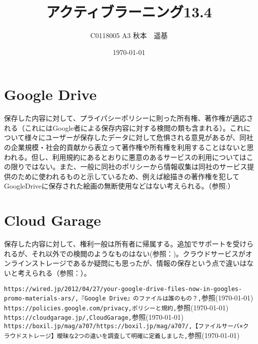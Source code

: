 \documentclass[uplatex]{jsarticle} %
\title{アクティブラーニング13.4}
\author{C0118005 A3 秋本　遥基}
\date{\today}
\begin{document}
\maketitle

\section{Google Drive}

  保存した内容に対して、プライパシーポリシーに則った所有権、著作権が適応される（これにはGoogle者による保存内容に対する検閲の類も含まれる）。これについて様々にユーザーが保存したデータに対して危惧される意見があるが、同社の企業規模・社会的貢献から表立って著作権や所有権を利用することはないと思われる。但し、利用規約にあるとおりに悪意のあるサービスの利用についてはこの限りではない。また、一般に同社のポリシーから情報収集は同社のサービス提供のために使われるものと示しているため、例えば絵描きの著作権を犯してGoogleDriveに保存された絵画の無断使用などはない考えられる。（参照:\cite{source}\cite{pli}）

\section{Cloud Garage}

  保存した内容に対して、権利一般は所有者に帰属する。追加でサポートを受けられるが、それ以外での検閲のようなものはない(参照：\cite{cloud})。クラウドサービスがオンラインストレージであるか疑問にも思ったが、情報の保存という点で違いはないと考えられる（参照：\cite{tigai}）。

\begin{thebibliography}{9}
   \verb+https://wired.jp/2012/04/27/your-google-drive-files-now-in-googles-promo-materials-ars/,『Google Drive』のファイルは誰のもの？,+参照(\today)
   \verb+https://policies.google.com/privacy,ポリシーと規約,+参照(\today)
   \verb+https://cloudgarage.jp/,CloudGarage,+参照(\today)
   \verb+https://boxil.jp/mag/a707/https://boxil.jp/mag/a707/,【ファイルサーバ×クラウドストレージ】曖昧な2つの違いを調査して明確に定義しました,+参照(\today)
\end{thebibliography}
\end{document}
